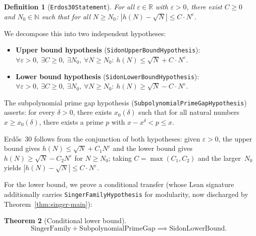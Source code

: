 \documentclass[11pt,a4paper]{article}
\newtheorem{theorem}{Theorem}[section]
\newtheorem{definition}[theorem]{Definition}
\begin{document}
\begin{definition}[\texttt{Erdos30Statement}]
For all $\varepsilon \in \mathbb{R}$ with $\varepsilon > 0$, there exist
$C \ge 0$ and $N_0 \in \mathbb{N}$ such that for all $N \ge N_0$:
$|h(N) - \sqrt{N}| \le C \cdot N^\varepsilon$.
\end{definition}

We decompose this into two independent hypotheses:

\begin{itemize}[nosep]
  \item \textbf{Upper bound hypothesis} (\texttt{SidonUpperBoundHypothesis}):
    $\forall \varepsilon > 0,\ \exists C \ge 0,\ \exists N_0,\
     \forall N \ge N_0:\ h(N) \le \sqrt{N} + C \cdot N^\varepsilon$.
  \item \textbf{Lower bound hypothesis} (\texttt{SidonLowerBoundHypothesis}):
    $\forall \varepsilon > 0,\ \exists C \ge 0,\ \exists N_0,\
     \forall N \ge N_0:\ h(N) \ge \sqrt{N} - C \cdot N^\varepsilon$.
\end{itemize}

\noindent The subpolynomial prime gap hypothesis
(\texttt{Sub\-poly\-nomial\-Prime\-Gap\-Hypothesis}) asserts: for every
$\delta > 0$, there exists $x_0(\delta)$ such that for all natural numbers
$x \ge x_0(\delta)$, there exists a prime $p$ with $x - x^\delta < p \le x$.

\noindent Erd\H{o}s~30 follows from the conjunction of both hypotheses:
given $\varepsilon > 0$, the upper bound gives $h(N) \le \sqrt{N} +
C_1 N^\varepsilon$ and the lower bound gives $h(N) \ge \sqrt{N} -
C_2 N^\varepsilon$ for $N \ge N_0$; taking $C = \max(C_1, C_2)$ and the
larger~$N_0$ yields $|h(N) - \sqrt{N}| \le C \cdot N^\varepsilon$.

For the lower bound, we prove a conditional transfer (whose Lean signature
additionally carries \texttt{SingerFamilyHypothesis} for modularity, now
discharged by Theorem~\ref{thm:singer-main}):

\begin{theorem}[Conditional lower bound]
\label{thm:cond-lower}
\[
\mathrm{SingerFamily} + \mathrm{SubpolynomialPrimeGap}
 \implies \mathrm{SidonLowerBound}.
\]
\end{theorem}
\end{document}
